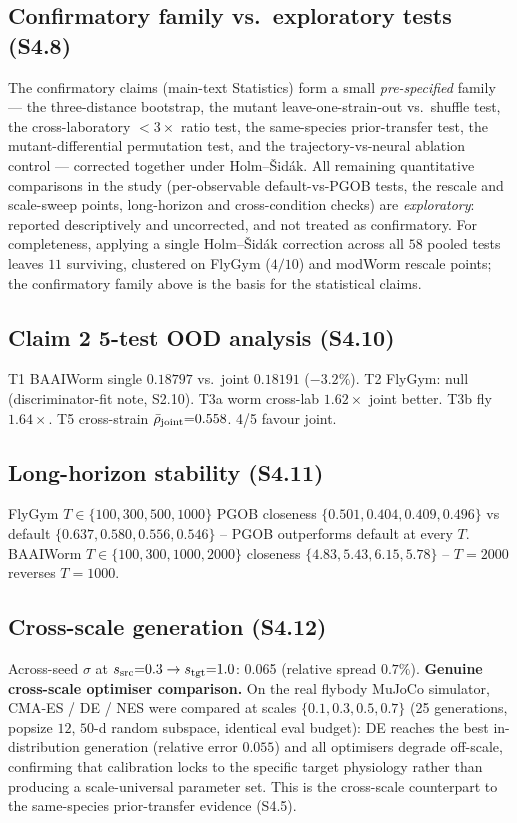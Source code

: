 \documentclass[11pt]{article}
\begin{document}
\subsection{Confirmatory family vs.\ exploratory tests (S4.8)}
The confirmatory claims (main-text Statistics) form a small \emph{pre-specified} family --- the three-distance bootstrap, the mutant leave-one-strain-out vs.\ shuffle test, the cross-laboratory $<3\times$ ratio test, the same-species prior-transfer test, the mutant-differential permutation test, and the trajectory-vs-neural ablation control --- corrected together under Holm--\v{S}id\'ak. All remaining quantitative comparisons in the study (per-observable default-vs-PGOB tests, the rescale and scale-sweep points, long-horizon and cross-condition checks) are \emph{exploratory}: reported descriptively and uncorrected, and not treated as confirmatory. For completeness, applying a single Holm--\v{S}id\'ak correction across all $58$ pooled tests leaves $11$ surviving, clustered on FlyGym ($4/10$) and modWorm rescale points; the confirmatory family above is the basis for the statistical claims.

\subsection{Claim 2 5-test OOD analysis (S4.10)}
T1 BAAIWorm single $0.18797$ vs.\ joint $0.18191$ ($-3.2\%$). T2 FlyGym: null (discriminator-fit note, S2.10). T3a worm cross-lab $1.62\times$ joint better. T3b fly $1.64\times$. T5 cross-strain $\bar\rho_{\rm joint}{=}0.558$. 4/5 favour joint.

\subsection{Long-horizon stability (S4.11)}
FlyGym $T{\in}\{100,300,500,1000\}$ PGOB closeness $\{0.501,0.404,0.409,0.496\}$ vs default $\{0.637,0.580,0.556,0.546\}$ -- PGOB outperforms default at every $T$. BAAIWorm $T{\in}\{100,300,1000,2000\}$ closeness $\{4.83,5.43,6.15,5.78\}$ -- $T{=}2000$ reverses $T{=}1000$.

\subsection{Cross-scale generation (S4.12)}
Across-seed $\sigma$ at $s_{\rm src}{=}0.3\to s_{\rm tgt}{=}1.0$: 0.065 (relative spread $0.7\%$). \textbf{Genuine cross-scale optimiser comparison.} On the real flybody MuJoCo simulator, CMA-ES / DE / NES were compared at scales $\{0.1,0.3,0.5,0.7\}$ (25 generations, popsize $12$, $50$-d random subspace, identical eval budget): DE reaches the best in-distribution generation (relative error $0.055$) and all optimisers degrade off-scale, confirming that calibration locks to the specific target physiology rather than producing a scale-universal parameter set. This is the cross-scale counterpart to the same-species prior-transfer evidence (S4.5).
\end{document}
